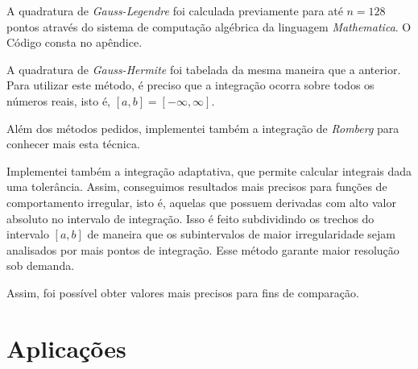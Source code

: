 \documentclass{homework}
\begin{document}
	
	
	
	A quadratura de \textit{Gauss-Legendre} foi calculada previamente para até $n = 128$ pontos através do sistema de computação algébrica da linguagem \textit{Mathematica}. O Código consta no apêndice.
	
	
	
	
	A quadratura de \textit{Gauss-Hermite} foi tabelada da mesma maneira que a anterior. Para utilizar este método, é preciso que a integração ocorra sobre todos os números reais, isto é, $[a, b] = [-\infty, \infty]$.
	
	
	
	\newpage
	
	
	Além dos métodos pedidos, implementei também a integração de \textit{Romberg} para conhecer mais esta técnica.
	
	

	
	Implementei também a integração adaptativa, que permite calcular integrais dada uma tolerância. Assim, conseguimos resultados mais precisos para funções de comportamento irregular, isto é, aquelas que possuem derivadas com alto valor absoluto no intervalo de integração. Isso é feito subdividindo os trechos do intervalo $[a, b]$ de maneira que os subintervalos de maior irregularidade sejam analisados por mais pontos de integração. Esse método garante maior resolução sob demanda. \par
	
	Assim, foi possível obter valores mais precisos para fins de comparação.
	
	
	
	\newpage
	\section*{Aplicações}
	
\end{document}
